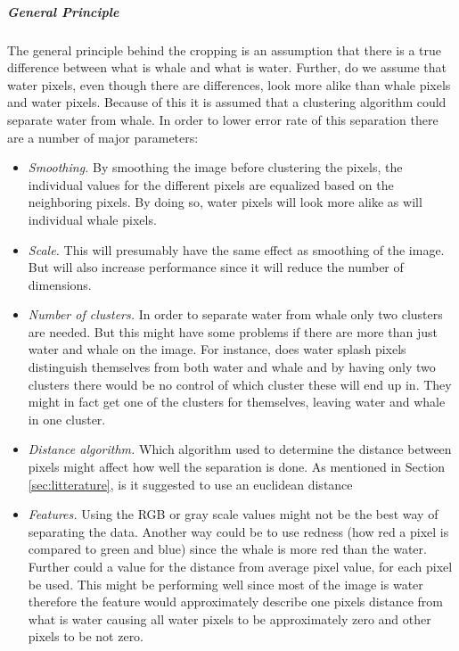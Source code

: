 \subparagraph{General Principle}
The general principle behind the cropping is an assumption that there is a true difference between what is whale and what is water. Further, do we assume that water pixels, even though there are differences, look more alike than whale pixels and water pixels.
Because of this it is assumed that a clustering algorithm could separate water from whale.
In order to lower error rate of this separation there are a number of major parameters:
\begin{itemize}
\item \textit{Smoothing.} By smoothing the image before clustering the pixels, the individual values for the different pixels are equalized based on the neighboring pixels. By doing so, water pixels will look more alike as will individual whale pixels.
\item \textit{Scale.} This will presumably have the same effect as smoothing of the image. But will also increase performance since it will reduce the number of dimensions.  
\item \textit{Number of clusters.} In order to separate water from whale only two clusters are needed. But this might have some problems if there are more than just water and whale on the image. For instance, does water splash pixels distinguish themselves from both water and whale and by having only two clusters there would be no control of which cluster these will end up in. They might in fact get one of the clusters for themselves, leaving water and whale in one cluster.
\item \textit{Distance algorithm.} Which algorithm used to determine the distance between pixels might affect how well the separation is done. As mentioned in Section \ref{sec:litterature}, is it suggested to use an euclidean distance
\item \textit{Features.} Using the RGB or gray scale values might not be the best way of separating the data. Another way could be to use redness (how red a pixel is compared to green and blue) since the whale is more red than the water. Further could a value for the distance from average pixel value, for each pixel be used. This might be performing well since most of the image is water therefore the feature would approximately describe one pixels distance from what is water causing all water pixels to be approximately zero and other pixels to be not zero.
\end{itemize}
